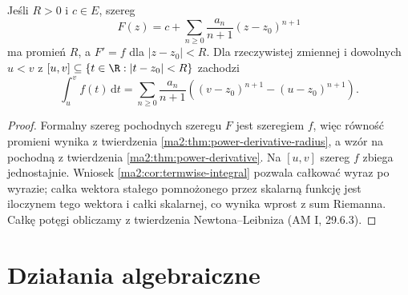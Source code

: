 \begin{wniosek}
\label{ma2:cor:power-primitive}
Jeśli $R>0$ i $c\in E$, szereg
\[
 F(z)=c+\sum_{n\ge0}\frac{a_n}{n+1}(z-z_0)^{n+1}
\]
ma promień $R$, a $F'=f$ dla $|z-z_0|<R$.
Dla rzeczywistej zmiennej i dowolnych
$u<v$ z $[u,v]\subseteq\{t\in\R:|t-z_0|<R\}$
zachodzi
\[
 \int_u^v f(t)\,\mathrm dt
 =\sum_{n\ge0}\frac{a_n}{n+1}
      ((v-z_0)^{n+1}-(u-z_0)^{n+1}).
\]
\end{wniosek}
\begin{proof}
Formalny szereg pochodnych szeregu $F$ jest
szeregiem $f$, więc równość promieni wynika
z twierdzenia \ref{ma2:thm:power-derivative-radius},
a wzór na pochodną z twierdzenia
\ref{ma2:thm:power-derivative}.
Na $[u,v]$ szereg $f$ zbiega jednostajnie.
Wniosek \ref{ma2:cor:termwise-integral} pozwala
całkować wyraz po wyrazie; całka wektora stałego
pomnożonego przez skalarną funkcję jest iloczynem
tego wektora i całki skalarnej, co wynika wprost
z sum Riemanna. Całkę potęgi obliczamy
z twierdzenia Newtona--Leibniza (AM I, 29.6.3).
\end{proof}

\section{Działania algebraiczne}

